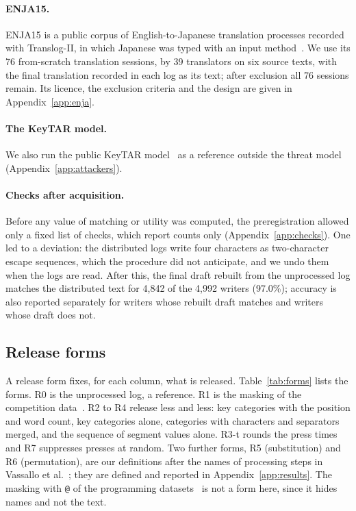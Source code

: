 \paragraph{ENJA15.}
ENJA15 is a public corpus of English-to-Japanese translation processes recorded with Translog-II, in which Japanese was
typed with an input method~\cite{carl2016lrec,zou2026translog}. We use its 76 from-scratch translation sessions, by 39
translators on six source texts, with the final translation recorded in each log as its text; after exclusion
all 76 sessions remain. Its licence, the exclusion criteria and the design are given in
Appendix~\ref{app:enja}.

\paragraph{The KeyTAR model.}
We also run the public KeyTAR model~\cite{qiu2026keytar} as a reference outside the threat model
(Appendix~\ref{app:attackers}).

\paragraph{Checks after acquisition.}
Before any value of matching or utility was computed, the preregistration allowed only a fixed list of checks, which
report counts only (Appendix~\ref{app:checks}). One led to a deviation: the distributed logs write four characters as
two-character escape sequences, which the procedure did not anticipate, and we undo them when the logs are read. After
this, the final draft rebuilt from the unprocessed log matches the distributed text for 4,842 of the 4,992 writers
(97.0\%); accuracy is also reported separately for writers whose rebuilt draft matches and writers whose draft does not.

\subsection{Release forms}
\label{sec:data:forms}

A release form fixes, for each column, what is released. Table~\ref{tab:forms} lists the forms. R0 is the unprocessed
log, a reference. R1 is the masking of the competition data~\cite{kaggle2023lwp}. R2 to R4 release less and less: key
categories with the position and word count, key categories alone, categories with characters and separators merged,
and the sequence of segment values alone. R3-t rounds the press times and R7 suppresses presses at random. Two further
forms, R5 (substitution) and R6 (permutation), are our definitions after the names of processing steps in Vassallo et
al.~\cite{vassallo2017privacy}; they are defined and reported in Appendix~\ref{app:results}. The masking with
\texttt{@} of the programming datasets~\cite{edwards2023csedm} is not a form here, since it hides names and not the
text.

